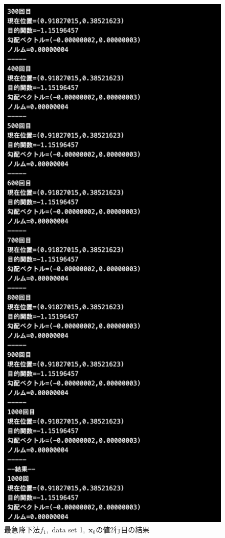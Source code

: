 \documentclass[12pt]{jarticle}
\begin{document}
\begin{figure}[h]
\begin{minipage}{0.5\hsize}
        \begin{center}
            \includegraphics[scale=0.2]{kadai1_1s_out1_2_3.png}
        \end{center}
    \end{minipage}
    \caption{最急降下法$f_1$,\ data set 1,\ $\boldsymbol{x}_0$の値2行目の結果}
\end{figure}
\end{document}
